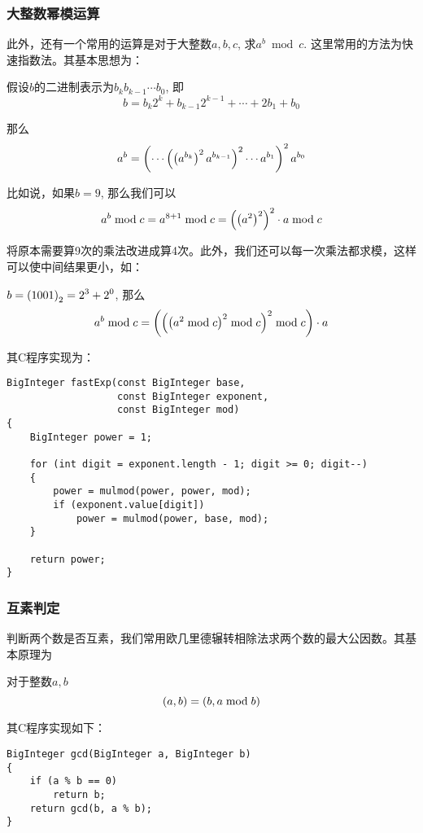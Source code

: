 \subsubsection{大整数幂模运算}
此外，还有一个常用的运算是对于大整数$a, b, c$, 求$a^b\bmod{c}$. 这里常用的方法为快速指数法。其基本思想为：\par
假设$b$的二进制表示为$b_kb_{k-1}\cdots b_0$, 即
\begin{equation}
b=b_k2^k+b_{k-1}2^{k-1}+\cdots +2b_1+b_0
\end{equation}

那么
\begin{equation}
a^b=\left( {\cdots \left( {\left( {a^{b_k}}\right)^2a^{b_{k-1}}}\right)^2\cdots a^{b_{1}}}\right)^2a^{b_0}
\end{equation}

比如说，如果$b=9$, 那么我们可以
\[a^b\bmod{c}=a^{8+1}\bmod{c}=\left( {\left( {a^2}\right)^2}\right)^2\cdot a\bmod{c}\]

将原本需要算9次的乘法改进成算4次。此外，我们还可以每一次乘法都求模，这样可以使中间结果更小，如：\par
$\displaystyle b=\left( {1001}\right)_2=2^3+2^0$, 那么
\[
a^b\bmod{c}=\left( {\left( {\left( {a^2\bmod{c}}\right)^2\bmod{c}}\right)^2\bmod{c}}\right)\cdot a
\]

其C程序实现为：
\begin{prove}
\begin{verbatim}
BigInteger fastExp(const BigInteger base,
                   const BigInteger exponent,
                   const BigInteger mod)
{
    BigInteger power = 1;
    
    for (int digit = exponent.length - 1; digit >= 0; digit--)
    {
        power = mulmod(power, power, mod);
        if (exponent.value[digit])
            power = mulmod(power, base, mod);
    }
    
    return power;
}
\end{verbatim}
\end{prove}
\subsubsection{互素判定}
判断两个数是否互素，我们常用欧几里德辗转相除法求两个数的最大公因数。其基本原理为
\begin{theorem}
对于整数$a, b$
\begin{equation}
\left( {a, b}\right)=\left( {b, a\bmod{b}}\right)
\end{equation}
\end{theorem}

其C程序实现如下：
\begin{prove}
\begin{verbatim}
BigInteger gcd(BigInteger a, BigInteger b)
{
    if (a % b == 0)
        return b;
    return gcd(b, a % b);
}
\end{verbatim}
\end{prove}
